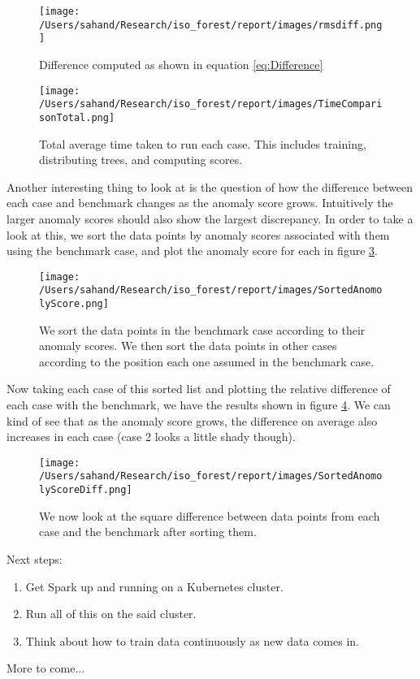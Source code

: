 \documentclass{amsart}
\begin{document}
\begin{figure}[H]
	\texttt{[image: /Users/sahand/Research/iso\_forest/report/images/rmsdiff.png]}
	\caption{Difference computed as shown in equation \ref{eq:Difference}}
	\label{fig:Difference}
\end{figure}


\begin{figure}[H]
	\texttt{[image: /Users/sahand/Research/iso\_forest/report/images/TimeComparisonTotal.png]}
	\caption{Total average time taken to run each case. This includes training, distributing trees, and computing scores.}
	\label{fig:TotalTime}
\end{figure}


Another interesting thing to look at is the question of how the difference between each case and benchmark changes as the anomaly score grows. Intuitively the larger anomaly scores should also show the largest discrepancy. In order to take a look at this, we sort the data points by anomaly scores associated with them using the benchmark case, and plot the anomaly score for each in figure \ref{fig:SortedScores}.

\begin{figure}[H]
	\texttt{[image: /Users/sahand/Research/iso\_forest/report/images/SortedAnomolyScore.png]}
	\caption{We sort the data points in the benchmark case according to their anomaly scores. We then sort the data points in other cases according to the position each one assumed in the benchmark case.}
	\label{fig:SortedScores}
\end{figure}

Now taking each case of this sorted list and plotting the relative difference of each case with the benchmark, we have the results shown in figure \ref{fig:SortedScoresDiff}. We can kind of see that as the anomaly score grows, the difference on average also increases in each case (case 2 looks a little shady though). 


\begin{figure}[H]
	\texttt{[image: /Users/sahand/Research/iso\_forest/report/images/SortedAnomolyScoreDiff.png]}
	\caption{We now look at the square difference between data points from each case and the benchmark after sorting them.}
	\label{fig:SortedScoresDiff}
\end{figure}

Next steps:

\begin{enumerate}

	\item Get Spark up and running on a Kubernetes cluster.
	\item Run all of this on the said cluster.
	\item Think about how to train data continuously as new data comes in. 

\end{enumerate}


More to come...
\end{document}

